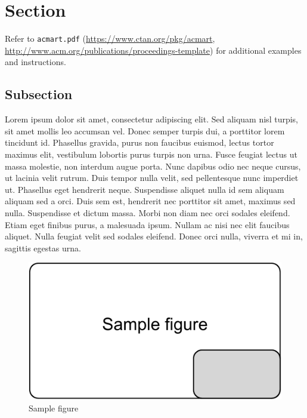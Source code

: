 \documentclass[10pt,sigconf]{acmart}
\begin{document}
\maketitle

\section{Section}

Refer to \verb|acmart.pdf| \cite{veytsmanlatex} (\url{https://www.ctan.org/pkg/acmart}, \url{http://www.acm.org/publications/proceedings-template}) for additional examples and instructions.

\subsection{Subsection}

Lorem ipsum dolor sit amet, consectetur adipiscing elit.
Sed aliquam nisl turpis, sit amet mollis leo accumsan vel.
Donec semper turpis dui, a porttitor lorem tincidunt id.\cite{Case}
Phasellus gravida, purus non faucibus euismod, lectus tortor maximus elit, vestibulum lobortis purus turpis non urna.
Fusce feugiat lectus ut massa molestie, non interdum augue porta.
Nunc dapibus odio nec neque cursus, ut lacinia velit rutrum.
Duis tempor nulla velit, sed pellentesque nunc imperdiet ut.
Phasellus eget hendrerit neque.
Suspendisse aliquet nulla id sem aliquam aliquam sed a orci.
Duis sem est, hendrerit nec porttitor sit amet, maximus sed nulla.
Suspendisse et dictum massa.
Morbi non diam nec orci sodales eleifend.
Etiam eget finibus purus, a malesuada ipsum.
Nullam ac nisi nec elit faucibus aliquet.
Nulla feugiat velit sed sodales eleifend.
Donec orci nulla, viverra et mi in, sagittis egestas urna.

\begin{figure}[htbp]
  \centering
  \includegraphics[scale=0.5]{sample-figure}
  \caption{Sample figure}
  \label{fig:sample}
\end{figure}
\end{document}
